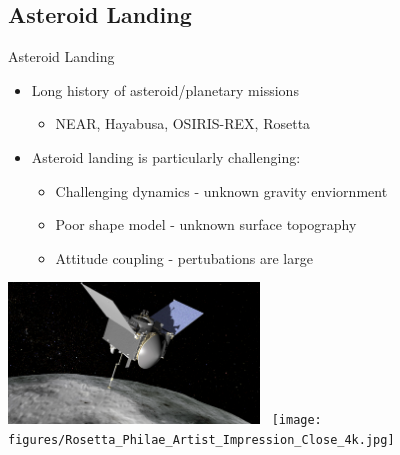\documentclass[11pt,professionalfonts,aspectratio=169]{beamer}
\begin{document}
\subsection[Landing]{Asteroid Landing}  
\begin{frame}{Asteroid Landing}
    \begin{itemize}
        \item Long history of asteroid/planetary missions
            \begin{itemize}
                \item NEAR, Hayabusa, OSIRIS-REX, Rosetta
            \end{itemize}
            \pause
        \item Asteroid landing is particularly challenging:
            \begin{itemize}
                \item<2-> Challenging dynamics - unknown gravity enviornment
                \item<2-> Poor shape model - unknown surface topography
                \item<2-> Attitude coupling - pertubations are large 
            \end{itemize}
    \end{itemize}
    \begin{center}
        \includegraphics[width=0.5\textwidth,height=0.4\textheight,keepaspectratio]{figures/osiris_rex.png}~
        \texttt{[image: figures/Rosetta\_Philae\_Artist\_Impression\_Close\_4k.jpg]}
    \end{center} 
\end{frame}
\end{document}
